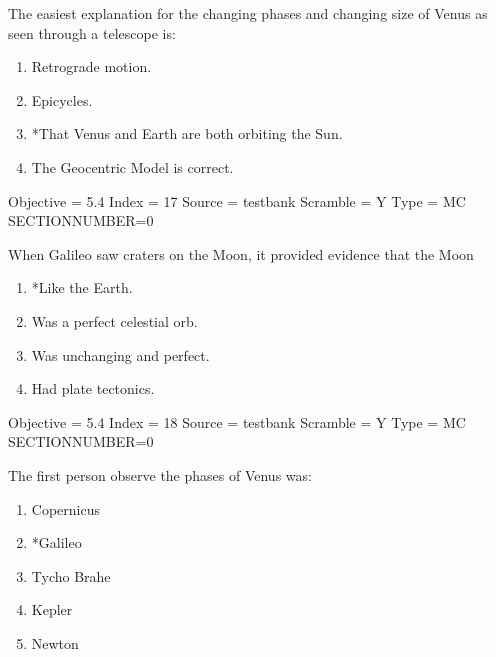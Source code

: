 \documentclass[11pt]{article}
\begin{document}
\begin{enumerate}
\begin{minipage}{\textwidth}
\begin{minipage}{\textwidth}
\item The easiest explanation for the changing phases and changing size of Venus as seen through a telescope is:
\begin{enumerate} 
\setlength{\itemsep}{1pt} 
\setlength{\parskip}{0pt} 
\setlength{\parsep}{0pt}
\setlength{\multicolsep}{1pt} 
\item Retrograde motion.
\item Epicycles.
\item *That Venus and Earth are both orbiting the Sun.
\item The Geocentric Model is correct.
\end{enumerate} 
Objective = 5.4
Index = 17
Source = testbank
Scramble = Y
Type = MC
SECTIONNUMBER=0
\end{minipage}
\end{minipage}
\vskip 0.20in

\begin{minipage}{\textwidth}
\begin{minipage}{\textwidth}
\item When Galileo saw craters on the Moon, it provided evidence that the Moon
\begin{multicols}{2}
\begin{enumerate} 
\setlength{\itemsep}{1pt} 
\setlength{\parskip}{0pt} 
\setlength{\parsep}{0pt}
\setlength{\multicolsep}{1pt} 
\item *Like the Earth.
\item Was a perfect celestial orb.
\item Was unchanging and perfect.
\item Had plate tectonics.
\end{enumerate} 
\vfill 
\end{multicols}

Objective = 5.4
Index = 18
Source = testbank
Scramble = Y
Type = MC
SECTIONNUMBER=0
\end{minipage}
\end{minipage}
\vskip 0.20in

\begin{minipage}{\textwidth}
\begin{minipage}{\textwidth}
\item The first person observe the phases of Venus was:
\begin{multicols}{3}
\begin{enumerate} 
\setlength{\itemsep}{1pt} 
\setlength{\parskip}{0pt} 
\setlength{\parsep}{0pt}
\setlength{\multicolsep}{1pt} 
\item Copernicus
\item *Galileo
\item Tycho Brahe
\item Kepler
\item Newton
\end{enumerate} 
\vfill 
\end{multicols}


\end{minipage}
\end{minipage}
\end{enumerate}
\end{document}
